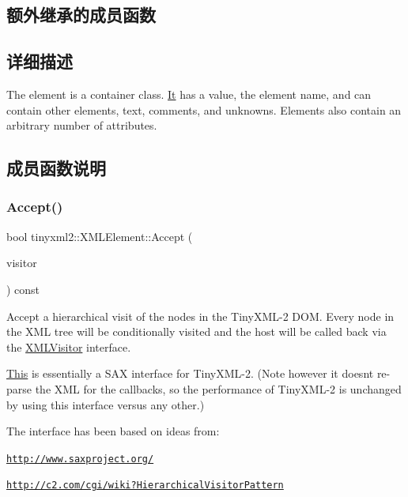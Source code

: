 \subsection*{额外继承的成员函数}


\subsection{详细描述}
The element is a container class. \hyperlink{class_it}{It} has a value, the element name, and can contain other elements, text, comments, and unknowns. Elements also contain an arbitrary number of attributes. 

\subsection{成员函数说明}
\mbox{\label{classtinyxml2_1_1_x_m_l_element_a9b2119831e8b85827d5d3e5076788e4a}} 
\subsubsection{\texorpdfstring{Accept()}{Accept()}}
{\footnotesize\ttfamily bool tinyxml2\+::\+X\+M\+L\+Element\+::\+Accept (\begin{DoxyParamCaption}\item[{\hyperlink{classtinyxml2_1_1_x_m_l_visitor}{X\+M\+L\+Visitor} $\ast$}]{visitor }\end{DoxyParamCaption}) const\hspace{0.3cm}{\ttfamily [virtual]}}

Accept a hierarchical visit of the nodes in the Tiny\+X\+M\+L-\/2 D\+OM. Every node in the X\+ML tree will be conditionally visited and the host will be called back via the \hyperlink{classtinyxml2_1_1_x_m_l_visitor}{X\+M\+L\+Visitor} interface.

\hyperlink{namespace_this}{This} is essentially a S\+AX interface for Tiny\+X\+M\+L-\/2. (Note however it doesn\textquotesingle{}t re-\/parse the X\+ML for the callbacks, so the performance of Tiny\+X\+M\+L-\/2 is unchanged by using this interface versus any other.)

The interface has been based on ideas from\+:


\begin{DoxyItemize}
\item \href{http://www.saxproject.org/}{\tt http\+://www.\+saxproject.\+org/}
\item \href{http://c2.com/cgi/wiki?HierarchicalVisitorPattern}{\tt http\+://c2.\+com/cgi/wiki?\+Hierarchical\+Visitor\+Pattern}
\end{DoxyItemize}

